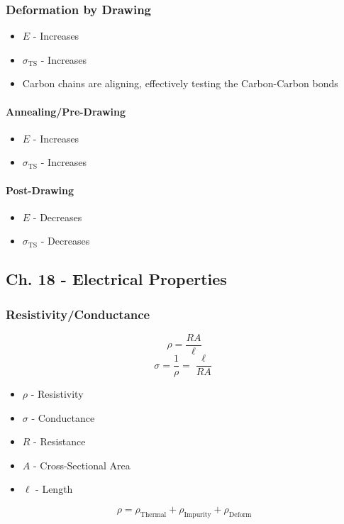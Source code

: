 		\subsubsection{Deformation by Drawing} \label{subsubsec:Polymer Deformation by Drawing}
			\begin{itemize}[noitemsep]
				\item $E$ - Increases
				\item $\sigma_{\text{TS}}$ - Increases
				\item Carbon chains are aligning, effectively testing the Carbon-Carbon bonds
			\end{itemize}
		
			\paragraph{Annealing/Pre-Drawing} \label{par:Polymer Annealing/Pre-Drawing}
				\begin{itemize}[noitemsep]
					\item $E$ - Increases
					\item $\sigma_{\text{TS}}$ - Increases
				\end{itemize}
			
			\paragraph{Post-Drawing} \label{par:Polymer Post-Drawing}
				\begin{itemize}[noitemsep]
					\item $E$ - Decreases
					\item $\sigma_{\text{TS}}$ - Decreases
				\end{itemize}
	
	\subsection{Ch. 18 - Electrical Properties}
		\subsubsection{Resistivity/Conductance} \label{subsubsec:Resistivity/Conductance}
			\begin{equation} \label{eq:Resistivity}
				\rho = \frac{RA}{\ell}
			\end{equation}
			\begin{equation} \label{eq:Conductance}
				\sigma = \frac{1}{\rho} = \frac{\ell}{RA}
			\end{equation}
			\begin{itemize}[noitemsep]
				\item $\rho$ - Resistivity
				\item $\sigma$ - Conductance
				\item $R$ - Resistance
				\item $A$ - Cross-Sectional Area
				\item $\ell$ - Length
			\end{itemize}
			\begin{equation} \label{eq:Total Resistivity}
				\rho = \rho_{\text{Thermal}} + \rho_{\text{Impurity}} + \rho_{\text{Deform}}
			\end{equation}
		
